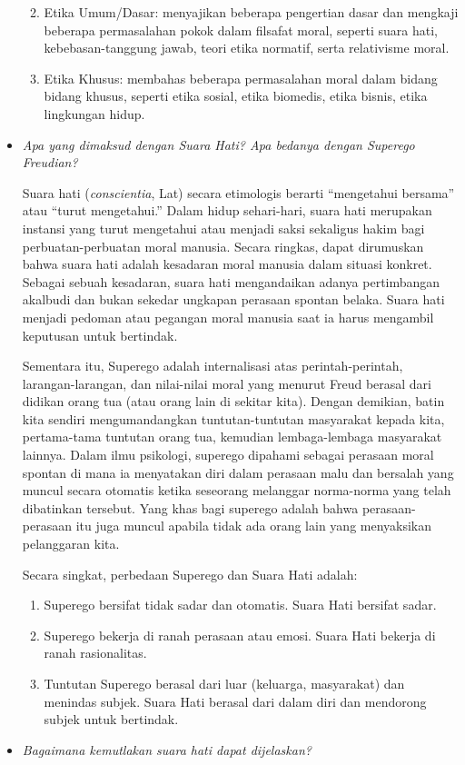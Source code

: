 \documentclass[10pt,a4paper]{article}
\def\tightlist{}
\begin{document}
\begin{multicols}{2}
\begin{itemize}
  \begin{enumerate}
  \def\labelenumi{\arabic{enumi}.}
  \tightlist
  \item
    Etika Umum/Dasar: menyajikan beberapa pengertian dasar dan mengkaji
    beberapa permasalahan pokok dalam filsafat moral, seperti suara
    hati, kebebasan-tanggung jawab, teori etika normatif, serta
    relativisme moral.
  \item
    Etika Khusus: membahas beberapa permasalahan moral dalam bidang
    bidang khusus, seperti etika sosial, etika biomedis, etika bisnis,
    etika lingkungan hidup.
  \end{enumerate}
\item
  \emph{Apa yang dimaksud dengan Suara Hati? Apa bedanya dengan Superego
  Freudian?}

  Suara hati (\emph{conscientia}, Lat) secara etimologis berarti
  ``mengetahui bersama'' atau ``turut mengetahui.'' Dalam hidup
  sehari-hari, suara hati merupakan instansi yang turut mengetahui atau
  menjadi saksi sekaligus hakim bagi perbuatan-perbuatan moral manusia.
  Secara ringkas, dapat dirumuskan bahwa suara hati adalah kesadaran
  moral manusia dalam situasi konkret. Sebagai sebuah kesadaran, suara
  hati mengandaikan adanya pertimbangan akalbudi dan bukan sekedar
  ungkapan perasaan spontan belaka. Suara hati menjadi pedoman atau
  pegangan moral manusia saat ia harus mengambil keputusan untuk
  bertindak.

  Sementara itu, Superego adalah internalisasi atas perintah-perintah,
  larangan-larangan, dan nilai-nilai moral yang menurut Freud berasal
  dari didikan orang tua (atau orang lain di sekitar kita). Dengan
  demikian, batin kita sendiri mengumandangkan tuntutan-tuntutan
  masyarakat kepada kita, pertama-tama tuntutan orang tua, kemudian
  lembaga-lembaga masyarakat lainnya. Dalam ilmu psikologi, superego
  dipahami sebagai perasaan moral spontan di mana ia menyatakan diri
  dalam perasaan malu dan bersalah yang muncul secara otomatis ketika
  seseorang melanggar norma-norma yang telah dibatinkan tersebut. Yang
  khas bagi superego adalah bahwa perasaan-perasaan itu juga muncul
  apabila tidak ada orang lain yang menyaksikan pelanggaran kita.

  Secara singkat, perbedaan Superego dan Suara Hati adalah:

  \begin{enumerate}
  \def\labelenumi{\alph{enumi}.}
  \tightlist
  \item
    Superego bersifat tidak sadar dan otomatis. Suara Hati bersifat
    sadar.
  \item
    Superego bekerja di ranah perasaan atau emosi. Suara Hati bekerja di
    ranah rasionalitas.
  \item
    Tuntutan Superego berasal dari luar (keluarga, masyarakat) dan
    menindas subjek. Suara Hati berasal dari dalam diri dan mendorong
    subjek untuk bertindak.
  \end{enumerate}
\item
  \emph{Bagaimana kemutlakan suara hati dapat dijelaskan?}


\end{itemize}
\end{multicols}
\end{document}
